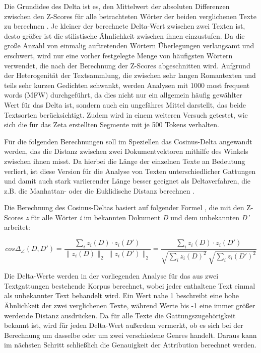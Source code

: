 \documentclass[a4paper,10p]{article}
\begin{document}
Die Grundidee des Delta ist es, den Mittelwert der absoluten Differenzen zwischen den Z-Scores für alle betrachteten Wörter der beiden verglichenen Texte zu berechnen \citep[vgl.][S. 17]{Stamatatos}. Je kleiner der berechnete Delta-Wert zwischen zwei Texten ist, desto größer ist die stilistische Ähnlichkeit zwischen ihnen einzustufen. Da die große Anzahl von einmalig auftretenden Wörtern Überlegungen verlangsamt und erschwert, wird nur eine vorher festgelegte Menge von häufigsten Wörtern verwendet, die nach der Berechnung der Z-Scores abgeschnitten wird. Aufgrund der Heterogenität der Textsammlung, die zwischen sehr langen Romantexten und teils sehr kurzen Gedichten schwankt, werden Analysen mit 1000 most frequent words (MFW) durchgeführt, da dies nicht nur ein allgemein häufig gewählter Wert für das Delta ist, sondern auch ein ungefähres Mittel darstellt, das beide Textsorten berücksichtigt. Zudem wird in einem weiteren Versuch getestet, wie sich die für das Zeta erstellten Segmente mit je 500 Tokens verhalten. \par 

Für die folgenden Berechnungen soll im Speziellen das Cosinus-Delta angewandt werden, das die Distanz zwischen zwei Dokumentvektoren mithilfe des Winkels zwischen ihnen misst. Da hierbei die Länge der einzelnen Texte an Bedeutung verliert, ist diese Version für die Analyse von Texten unterschiedlicher Gattungen und damit auch stark variierender Länge besser geeignet als Deltaverfahren, die z.B. die Manhattan- oder die Euklidische Distanz berechnen \citep[vgl.][S. ii9]{Evert2017a}.\par 

Die Berechnung des Cosinus-Deltas basiert auf folgender Formel \citep[vgl.][S. ii6]{Evert2017a}, die mit den Z-Scores \textit{z} für alle Wörter \textit{i} im bekannten Dokument \textit{D} und dem unbekannten \textit{D’} arbeitet:\\


	 \begin{equ}[!h]
		\begin{equation}
		cos \Delta_\angle (D, D') = \frac{\sum_i z_i(D) \cdot z_i(D')}{\|z_i(D)\|_2 \ \|z_i(D')\|_2} = \frac{\sum_i z_i(D) \cdot z_i(D')}{\sqrt{\sum_i z_i(D)^2} \ \sqrt{\sum_i z_i(D')^2}}
		\end{equation}
	\end{equ}


Die Delta-Werte werden in der vorliegenden Analyse für das aus zwei Textgattungen bestehende Korpus berechnet, wobei jeder enthaltene Text einmal als unbekannter Text behandelt wird. Ein Wert nahe 1 beschreibt eine hohe Ähnlichkeit der zwei verglichenen Texte, während Werte bis -1 eine immer größer werdende Distanz ausdrücken. Da für alle Texte die Gattungszugehörigkeit  bekannt ist, wird für jeden Delta-Wert außerdem vermerkt, ob es sich bei der Berechnung um dasselbe oder um zwei verschiedene Genres handelt. Daraus kann im nächsten Schritt schließlich die Genauigkeit der Attribution berechnet werden.
\end{document}
